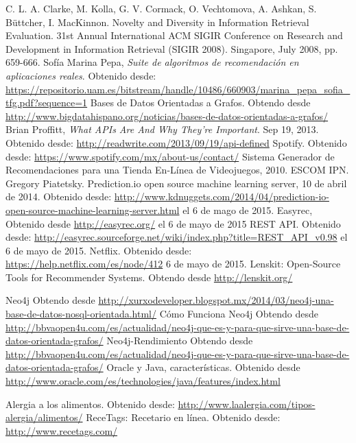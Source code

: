 \begin{thebibliography}{99}
C. L. A. Clarke, M. Kolla, G. V. Cormack, O. Vechtomova, A. Ashkan, S. Büttcher, I. MacKinnon. Novelty and Diversity in Information Retrieval Evaluation. 31st Annual International ACM SIGIR Conference on Research and Development in Information Retrieval (SIGIR 2008). Singapore, July 2008, pp. 659-666.
    Sofía Marina Pepa, \emph{Suite de algoritmos de recomendación en aplicaciones reales}. Obtenido desde: \url{https://repositorio.uam.es/bitstream/handle/10486/660903/marina_pepa_sofia_tfg.pdf?sequence=1}
    Bases de Datos Orientadas a Grafos. Obtendo desde \url{http://www.bigdatahispano.org/noticias/bases-de-datos-orientadas-a-grafos/} 
    Brian Proffitt, \emph{What APIs Are And Why They're Important}. Sep 19, 2013. Obtenido desde: \url{http://readwrite.com/2013/09/19/api-defined}
     Spotify. Obtenido desde: \url{https://www.spotify.com/mx/about-us/contact/}
     Sistema Generador de Recomendaciones para una Tienda En-Línea de Videojuegos, 2010. ESCOM IPN. 
    Gregory Piatetsky. Prediction.io open source machine learning server, 10 de abril de 2014. Obtenido desde: \url{http://www.kdnuggets.com/2014/04/prediction-io-open-source-machine-learning-server.html} el 6 de mago de 2015. 
    Easyrec, Obtenido desde \url{http://easyrec.org/} el 6 de mayo de 2015 
    REST API. Obtenido desde: \url{http://easyrec.sourceforge.net/wiki/index.php?title=REST_API_v0.98} el 6 de mayo de 2015. 
    Netflix. Obtenido desde: \url{https://help.netflix.com/es/node/412} 6 de mayo de 2015.
    Lenskit: Open-Source Tools for Recommender Systems. Obtendo desde \url{http://lenskit.org/}

    Neo4j Obtendo desde \url{http://xurxodeveloper.blogspot.mx/2014/03/neo4j-una-base-de-datos-nosql-orientada.html/}
    Cómo Funciona Neo4j Obtendo desde \url{http://bbvaopen4u.com/es/actualidad/neo4j-que-es-y-para-que-sirve-una-base-de-datos-orientada-grafos/}
    Neo4j-Rendimiento Obtendo desde \url{http://bbvaopen4u.com/es/actualidad/neo4j-que-es-y-para-que-sirve-una-base-de-datos-orientada-grafos/}	
    Oracle y Java, características. Obtenido desde \url{http://www.oracle.com/es/technologies/java/features/index.html}

      Alergia a los alimentos. Obtenido desde: \url{http://www.laalergia.com/tipos-alergia/alimentos/}
      ReceTags: Recetario en línea. Obtenido desde: \url{http://www.recetags.com/}


\end{thebibliography}
